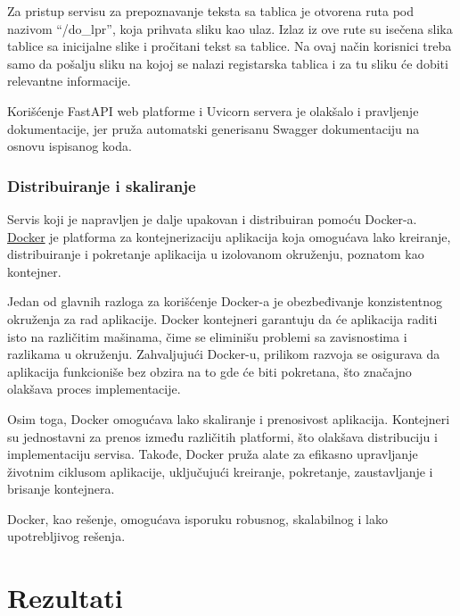 \documentclass[a4paper,12pt]{article}
\begin{document}
	Za pristup servisu za prepoznavanje teksta sa tablica je otvorena ruta pod nazivom \enquote{/do\_lpr}, koja prihvata sliku kao ulaz. Izlaz iz ove rute su isečena slika tablice sa inicijalne slike i pročitani tekst sa tablice. Na ovaj način korisnici treba samo da pošalju sliku na kojoj se nalazi registarska tablica i za tu sliku će dobiti relevantne informacije.
	
	Korišćenje FastAPI web platforme i Uvicorn servera je olakšalo i pravljenje dokumentacije, jer pruža automatski generisanu Swagger dokumentaciju na osnovu ispisanog koda.
	
	\subsubsection{Distribuiranje i skaliranje}
	Servis koji je napravljen je dalje upakovan i distribuiran pomoću Docker-a. \href{https://www.docker.com/}{Docker} je platforma za kontejnerizaciju aplikacija koja omogućava lako kreiranje, distribuiranje i pokretanje aplikacija u izolovanom okruženju, poznatom kao kontejner.
	
	Jedan od glavnih razloga za korišćenje Docker-a je obezbeđivanje konzistentnog okruženja za rad aplikacije. Docker kontejneri garantuju da će aplikacija raditi isto na različitim mašinama, čime se eliminišu problemi sa zavisnostima i razlikama u okruženju. Zahvaljujući Docker-u, prilikom razvoja se osigurava da aplikacija funkcioniše bez obzira na to gde će biti pokretana, što značajno olakšava proces implementacije.
	
	Osim toga, Docker omogućava lako skaliranje i prenosivost aplikacija. Kontejneri su jednostavni za prenos između različitih platformi, što olakšava distribuciju i implementaciju servisa. Takođe, Docker pruža alate za efikasno upravljanje životnim ciklusom aplikacije, uključujući kreiranje, pokretanje, zaustavljanje i brisanje kontejnera.
	
	Docker, kao rešenje, omogućava isporuku robusnog, skalabilnog i lako upotrebljivog rešenja.
	\newpage
	
	\section{Rezultati}
	
\end{document}
